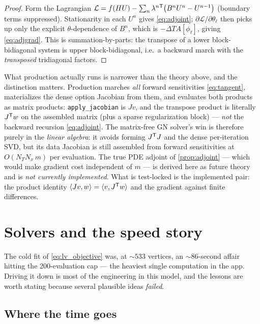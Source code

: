 \documentclass[11pt]{article}
\begin{document}
\begin{proof}
Form the Lagrangian
$\mathcal L=f(HU)-\sum_n\lambda^n{}^{\mathsf{T}}\big(B^nU^n-U^{n-1}\big)$ (boundary terms
suppressed). Stationarity in each $U^n$ gives \eqref{eq:adjoint};
$\partial\mathcal L/\partial\theta_\ell$ then picks up only the explicit
$\theta$-dependence of $B^n$, which is $-\Delta T A[\phi_\ell]$, giving
\eqref{eq:adjgrad}. This is summation-by-parts: the transpose of a lower
block-bidiagonal system is upper block-bidiagonal, i.e.\ a backward march with
the \emph{transposed} tridiagonal factors.
\end{proof}

What production actually runs is narrower than the theory above, and the
distinction matters. Production marches \emph{all} forward sensitivities
\eqref{eq:tangent}, materializes the dense option Jacobian from them, and
evaluates both products as matrix products: \texttt{apply\_jacobian} is $Jv$,
and the transpose product is literally $J^{\mathsf{T}} w$ on the assembled matrix (plus
a sparse regularization block) --- \emph{not} the backward recursion
\eqref{eq:adjoint}. The matrix-free GN
solver's win is therefore purely in the \emph{linear algebra}: it avoids
forming $J^{\mathsf{T}} J$ and the dense per-iteration SVD, but its data Jacobian is
still assembled from forward sensitivities at $O(N_TN_x\,m)$ per evaluation.
The true PDE adjoint of \cref{prop:adjoint} --- which would make gradient
cost independent of $m$ --- is derived here as future theory and is
\emph{not currently implemented}. What is test-locked is the implemented
pair: the product identity $\langle Jv,w\rangle=\langle v,J^{\mathsf{T}} w\rangle$ and the gradient
against finite differences.

\section{Solvers and the speed story}
\label{sec:solvers}

The cold fit of \eqref{eq:lv_objective} was, at $\sim533$ vertices, an
$\sim86$-second affair hitting the 200-evaluation cap --- the heaviest single
computation in the app. Driving it down is most of the engineering in this
model, and the lessons are worth stating because several plausible ideas
\emph{failed}.

\subsection{Where the time goes}
\end{document}
